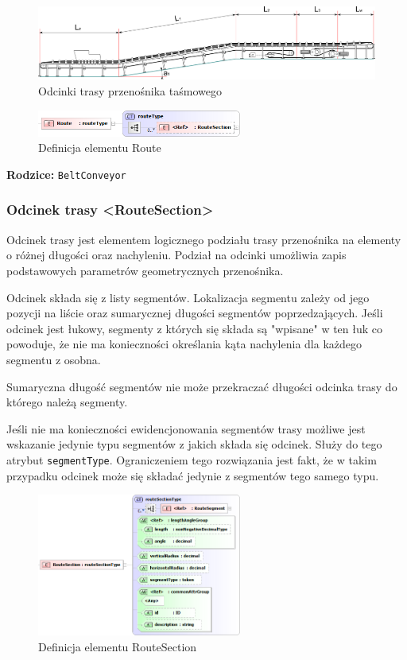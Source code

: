 \documentclass[12pt,a4paper]{article}
\begin{document}
\begin{figure}
  \centering
  \includegraphics[width=\textwidth]{png/belt_conveyor2_drw}
  \caption{Odcinki trasy przenośnika taśmowego}
  \label{fig:beltConveyor2-drw}
\end{figure}

\begin{figure}[H]
  \centering
  \includegraphics[width=0.6\textwidth]{png/liquid/Route}
  \caption{Definicja elementu Route}
  \label{fig:route-xsd}
\end{figure}

\noindent\textbf{Rodzice:} \texttt{BeltConveyor}


\subsubsection{Odcinek trasy <RouteSection>}
Odcinek trasy jest elementem logicznego podziału trasy przenośnika na elementy o
różnej długości oraz nachyleniu. Podział na odcinki umożliwia zapis podstawowych
parametrów geometrycznych przenośnika.

Odcinek składa się z listy segmentów. Lokalizacja segmentu zależy od jego
pozycji na liście oraz sumarycznej długości segmentów poprzedzających. Jeśli
odcinek jest łukowy, segmenty z których się składa są "wpisane" w ten łuk co
powoduje, że nie ma konieczności określania kąta nachylenia dla każdego segmentu
z osobna.

Sumaryczna długość segmentów nie może przekraczać długości odcinka trasy do
którego należą segmenty.

Jeśli nie ma konieczności ewidencjonowania segmentów trasy możliwe jest
wskazanie jedynie typu segmentów z jakich składa się odcinek. Służy do tego
atrybut {\tt segmentType}. Ograniczeniem tego rozwiązania jest fakt, że w takim
przypadku odcinek może się składać jedynie z segmentów tego samego typu.

\begin{figure}[H]
  \centering
  \includegraphics[width=0.6\textwidth]{png/liquid/RouteSection}
  \caption{Definicja elementu RouteSection}
  \label{fig:routeSection-xsd}
\end{figure}
\end{document}
